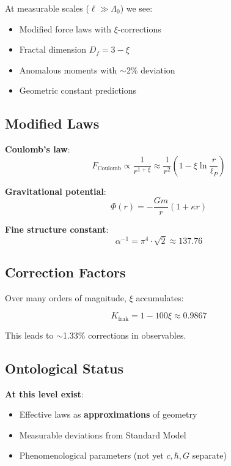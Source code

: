	\begin{keyresult}
		At measurable scales ($\ell \gg \Lambda_0$) we see:
		
		\begin{itemize}
			\item Modified force laws with $\xi$-corrections
			\item Fractal dimension $D_f = 3-\xi$
			\item Anomalous moments with $\sim$2\% deviation
			\item Geometric constant predictions
		\end{itemize}
	\end{keyresult}
	
	\subsection{Modified Laws}
	
	\textbf{Coulomb's law}:
	\begin{equation}
		F_{\text{Coulomb}} \propto \frac{1}{r^{1+\xi}} \approx \frac{1}{r^2} \left(1 - \xi \ln\frac{r}{\ell_P}\right)
	\end{equation}
	
	\textbf{Gravitational potential}:
	\begin{equation}
		\Phi(r) = -\frac{Gm}{r}(1 + \kappa r)
	\end{equation}
	
	\textbf{Fine structure constant}:
	\begin{equation}
		\alpha^{-1} = \pi^4 \cdot \sqrt{2} \approx 137.76
	\end{equation}
	
	\subsection{Correction Factors}
	
	Over many orders of magnitude, $\xi$ accumulates:
	
	\begin{equation}
		K_{\text{frak}} = 1 - 100\xi \approx 0.9867
	\end{equation}
	
	This leads to $\sim$1.33\% corrections in observables.
	
	\subsection{Ontological Status}
	
	\textbf{At this level exist}:
	\begin{itemize}
		\item Effective laws as \textbf{approximations} of geometry
		\item Measurable deviations from Standard Model
		\item Phenomenological parameters (not yet $c, \hbar, G$ separate)
	\end{itemize}
	
